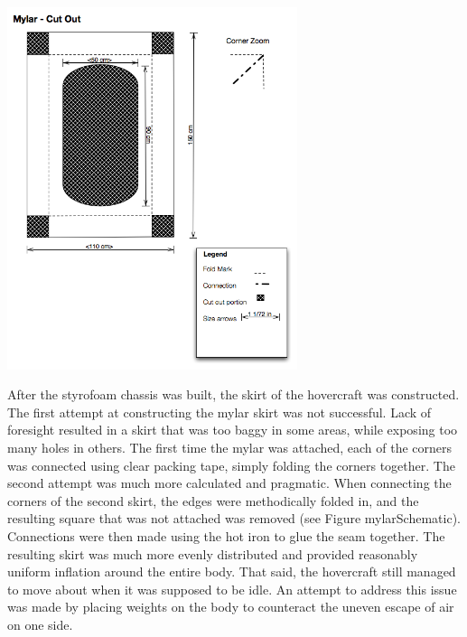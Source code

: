 \begin{minipage}{6.5in}
  \begin{center}
    \includegraphics[width=85mm]{imageSources/mylarSchematic.png}
  \end{center}
  \label{mylarSchematic}
\end{minipage}

After the styrofoam chassis was built, the skirt of the hovercraft was constructed. The first attempt at constructing the mylar skirt was not successful. Lack of foresight resulted in a skirt that was too baggy in some areas, while exposing too many holes in others. The first time the mylar was attached, each of the corners was connected using clear packing tape, simply folding the corners together. The second attempt was much more calculated and pragmatic. When connecting the corners of the second skirt, the edges were methodically folded in, and the resulting square that was not attached was removed (see Figure mylarSchematic). Connections were then made using the hot iron to glue the seam together. The resulting skirt was much more evenly distributed and provided reasonably uniform inflation around the entire body. That said, the hovercraft still managed to move about when it was supposed to be idle. An attempt to address this issue was made by placing weights on the body to counteract the uneven escape of air on one side.

